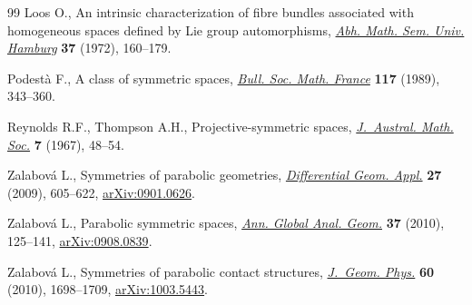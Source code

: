 \documentclass[10pt,a4paper]{amsart}
\numberwithin{equation}{section}
\begin{document}
\begin{thebibliography}{99}
Loos O., An intrinsic characterization of f\/ibre bundles associated with
 homogeneous spaces def\/ined by {L}ie group automorphisms, \href{https://doi.org/10.1007/BF02999694}{\textit{Abh. Math.
 Sem. Univ. Hamburg}} \textbf{37} (1972), 160--179.

Podest\`a F., A class of symmetric spaces, \href{https://doi.org/10.24033/bsmf.2127}{\textit{Bull. Soc. Math. France}}
 \textbf{117} (1989), 343--360.

Reynolds R.F., Thompson A.H., Projective-symmetric spaces, \href{https://doi.org/10.1017/S1446788700005085}{\textit{J.~Austral.
 Math. Soc.}} \textbf{7} (1967), 48--54.

Zalabov\'a L., Symmetries of parabolic geometries, \href{https://doi.org/10.1016/j.difgeo.2009.03.001}{\textit{Differential Geom.
 Appl.}} \textbf{27} (2009), 605--622, \href{http://arxiv.org/abs/0901.0626}{arXiv:0901.0626}.

Zalabov\'a L., Parabolic symmetric spaces, \href{https://doi.org/10.1007/s10455-009-9177-5}{\textit{Ann. Global Anal. Geom.}}
 \textbf{37} (2010), 125--141, \href{http://arxiv.org/abs/0908.0839}{arXiv:0908.0839}.

Zalabov\'a L., Symmetries of parabolic contact structures, \href{https://doi.org/10.1016/j.geomphys.2010.06.013}{\textit{J.~Geom.
 Phys.}} \textbf{60} (2010), 1698--1709, \href{http://arxiv.org/abs/1003.5443}{arXiv:1003.5443}.

\end{thebibliography}
\end{document}

